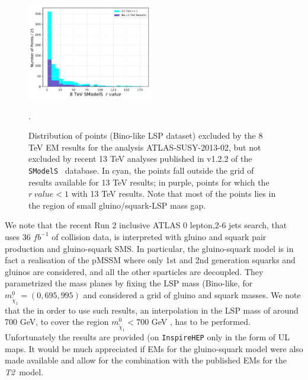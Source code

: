 \documentclass[a4paper,11pt]{article}
\newcommand{\SMO}{\texttt{SModelS\xspace}}
\newcommand{\Ttwo}{ \textit{T2}}
\begin{document}
\begin{figure}  
	\begin{center}
		
		\includegraphics[width=0.49\textwidth]{PLOTS/13TeV/rvalues.pdf}
		
	\end{center}
	\caption{Distribution of points (Bino-like LSP dataset) excluded by the 8 TeV EM results for the analysis ATLAS-SUSY-2013-02, but not excluded by recent 13 TeV analyses published in v1.2.2 of the \SMO~ database. In cyan, the points fall outside the grid of results available for 13 TeV results; in purple, points for which the $r \ value <1$ with 13 TeV results. Note that most of the points lies in the region of small gluino/squark-LSP mass gap.}. 
	\label{13TeVrvalue}
\end{figure}

We note that the recent Run 2 inclusive ATLAS 0 lepton,2-6 jets search\cite{Aaboud:2017vwy}, that uses 36 $fb^{-1}$ of collision data, is interpreted with gluino and squark pair production and gluino-squark SMS. In particular, the gluino-squark model is in fact a realisation of the pMSSM where only 1st and 2nd generation squarks and gluinos are considered, and all the other sparticles are decoupled. They parametrized the mass planes by fixing the LSP mass (Bino-like, for $m_{\tilde \chi _1} ^0 = (0,695,995)$ and considered a grid of gluino and squark masses. We note that the in order to use such results, an interpolation in the LSP mass of around 700 GeV, to cover the region $m_{\tilde \chi _1} ^0 < 700$ GeV , has to be performed. Unfortunately the results are provided (on \texttt{InspireHEP}\cite{HEP201607} only in the form of UL maps. It would be much appreciated if EMs for the gluino-squark model were also made available and allow for the combination with the published EMs for the \Ttwo~model. 
\end{document}

